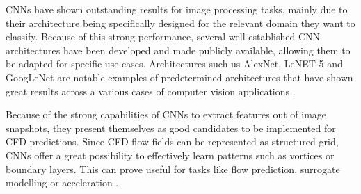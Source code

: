CNNs have shown outstanding results for image processing tasks, mainly due to their architecture being specifically designed for the relevant domain they want to classify. Because of this strong performance, several well-established CNN architectures have been developed and made publicly available, allowing them to be adapted for specific use cases. Architectures such us AlexNet, LeNET-5 and GoogLeNet are notable examples of predetermined architectures that have shown great results across a various cases of computer vision applications \cite{Alzubaidi2021}.

Because of the strong capabilities of CNNs to extract features out of image snapshots, they present themselves as good candidates to be implemented for CFD predictions. Since CFD flow fields can be represented as structured grid, CNNs offer a great possibility to effectively learn patterns such as vortices or boundary layers. This can prove useful for tasks like flow prediction, surrogate modelling or acceleration \cite{Lee_You_2019, Guo2016}.